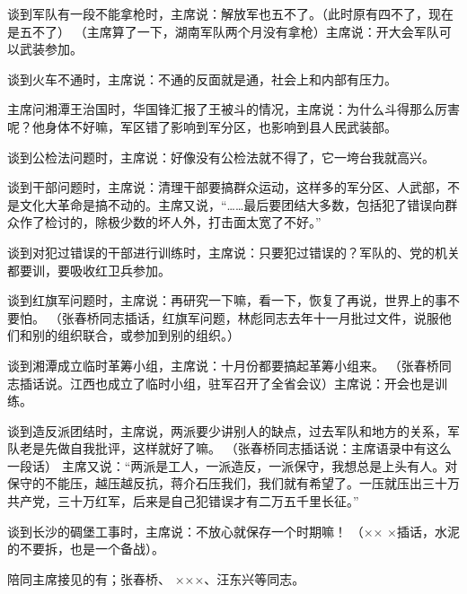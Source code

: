 谈到军队有一段不能拿枪时，主席说：解放军也五不了。（此时原有四不了，现在是五不了）  （主席算了一下，湖南军队两个月没有拿枪）主席说：开大会军队可以武装参加。

谈到火车不通时，主席说：不通的反面就是通，社会上和内部有压力。

主席问湘潭王治国时，华国锋汇报了王被斗的情况，主席说：为什么斗得那么厉害呢？他身体不好嘛，军区错了影响到军分区，也影响到县人民武装部。

谈到公检法问题时，主席说：好像没有公检法就不得了，它一垮台我就高兴。

谈到干部问题时，主席说：清理干部要搞群众运动，这样多的军分区、人武部，不是文化大革命是搞不动的。主席又说，“……最后要团结大多数，包括犯了错误向群众作了检讨的，除极少数的坏人外，打击面太宽了不好。”

谈到对犯过错误的干部进行训练时，主席说：只要犯过错误的？军队的、党的机关都要训，要吸收红卫兵参加。

谈到红旗军问题时，主席说：再研究一下嘛，看一下，恢复了再说，世界上的事不要怕。  （张春桥同志插话，红旗军问题，林彪同志去年十一月批过文件，说服他们和别的组织联合，或参加到别的组织。）

谈到湘潭成立临时革筹小组，主席说：十月份都要搞起革筹小组来。 （张春桥同志插话说。江西也成立了临时小组，驻军召开了全省会议）主席说：开会也是训练。

谈到造反派团结时，主席说，两派要少讲别人的缺点，过去军队和地方的关系，军队老是先做自我批评，这样就好了嘛。 （张春桥同志插话说：主席语录中有这么一段话） 主席又说：“两派是工人，一派造反，一派保守，我想总是上头有人。对保守的不能压，越压越反抗，蒋介石压我们，我们就有希望了。一压就压出三十万共产党，三十万红军，后来是自己犯错误才有二万五千里长征。”

谈到长沙的碉堡工事时，主席说：不放心就保存一个时期嘛！ （×× ×插话，水泥的不要拆，也是一个备战）。

陪同主席接见的有；张春桥、  ×××、汪东兴等同志。


